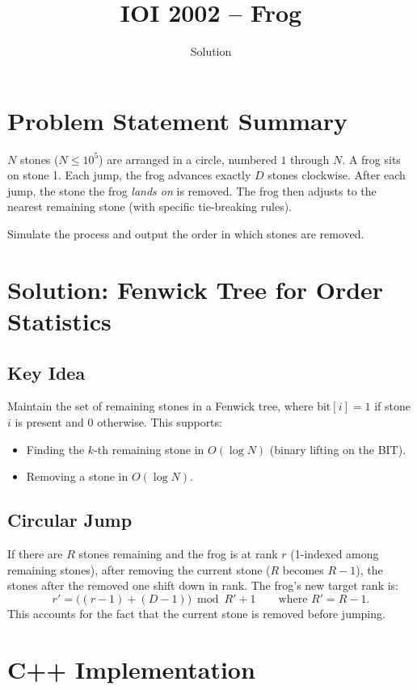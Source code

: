 \documentclass[11pt,a4paper]{article}
\title{IOI 2002 -- Frog}
\author{Solution}
\date{}
\begin{document}
\maketitle

\section{Problem Statement Summary}
$N$ stones ($N \le 10^5$) are arranged in a circle, numbered
$1$ through $N$. A frog sits on stone 1. Each jump, the frog advances
exactly $D$ stones clockwise. After each jump, the stone the frog
\emph{lands on} is removed. The frog then adjusts to the nearest
remaining stone (with specific tie-breaking rules).

Simulate the process and output the order in which stones are removed.

\section{Solution: Fenwick Tree for Order Statistics}

\subsection{Key Idea}
Maintain the set of remaining stones in a Fenwick tree, where
$\text{bit}[i] = 1$ if stone $i$ is present and $0$ otherwise. This
supports:
\begin{itemize}
  \item Finding the $k$-th remaining stone in $O(\log N)$ (binary
        lifting on the BIT).
  \item Removing a stone in $O(\log N)$.
\end{itemize}

\subsection{Circular Jump}
If there are $R$ stones remaining and the frog is at rank $r$ (1-indexed
among remaining stones), after removing the current stone ($R$ becomes
$R - 1$), the stones after the removed one shift down in rank. The
frog's new target rank is:
\[
  r' = \bigl((r - 1) + (D - 1)\bigr) \bmod R' + 1
  \qquad\text{where } R' = R - 1.
\]
This accounts for the fact that the current stone is removed before
jumping.

\section{C++ Implementation}
\end{document}
